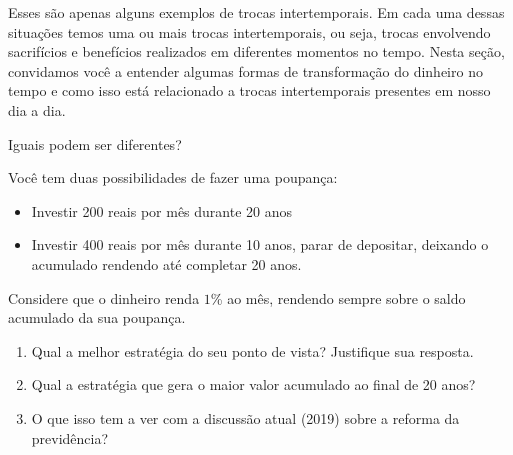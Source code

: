 Esses são apenas alguns exemplos de trocas intertemporais. Em cada uma dessas situações temos uma ou mais trocas intertemporais, ou seja, trocas envolvendo sacrifícios e benefícios realizados em diferentes momentos no tempo. Nesta seção, convidamos você a entender algumas formas de transformação do dinheiro no tempo e como isso está relacionado a trocas intertemporais presentes em nosso dia a dia.

\begin{task}{Iguais podem ser diferentes?}

Você tem duas possibilidades de fazer uma poupança:

\begin{itemize}

\item Investir 200 reais por mês durante 20 anos

\item Investir 400 reais por mês durante 10 anos, parar de depositar, deixando o acumulado rendendo até completar 20 anos.

\end{itemize}

Considere que o dinheiro renda $1$\% ao mês, rendendo sempre sobre o saldo acumulado da sua poupança. 

\begin{enumerate}

\item Qual a melhor estratégia do seu ponto de vista? Justifique sua resposta.

\item Qual a estratégia que gera o maior valor acumulado ao final de 20 anos?

\item O que isso tem a ver com a discussão atual (2019) sobre a reforma da previdência?
\end{enumerate}

\end{task}

